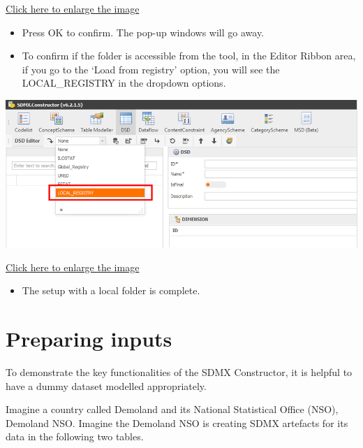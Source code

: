 \documentclass[
]{book}
\providecommand{\tightlist}{%
  \setlength{\itemsep}{0pt}\setlength{\parskip}{0pt}}
\theoremstyle{definition}
\theoremstyle{definition}
\theoremstyle{definition}
\theoremstyle{definition}
\theoremstyle{remark}
\begin{document}
\href{images/image056.png}{Click here to enlarge the image}

\begin{itemize}
\tightlist
\item
  Press OK to confirm. The pop-up windows will go away.
\item
  To confirm if the folder is accessible from the tool, in the Editor Ribbon area, if you go to the `Load from registry' option, you will see the LOCAL\_REGISTRY in the dropdown options.
\end{itemize}

\begin{center}\includegraphics[width=1\linewidth]{./images/image058} \end{center}

\href{images/image058.png}{Click here to enlarge the image}

\begin{itemize}
\tightlist
\item
  The setup with a local folder is complete.
\end{itemize}

\hypertarget{preparing-inputs}{%
\section{Preparing inputs}\label{preparing-inputs}}

To demonstrate the key functionalities of the SDMX Constructor, it is helpful to have a dummy dataset modelled appropriately.

Imagine a country called Demoland and its National Statistical Office (NSO), Demoland NSO. Imagine the Demoland NSO is creating SDMX artefacts for its data in the following two tables.
\end{document}
